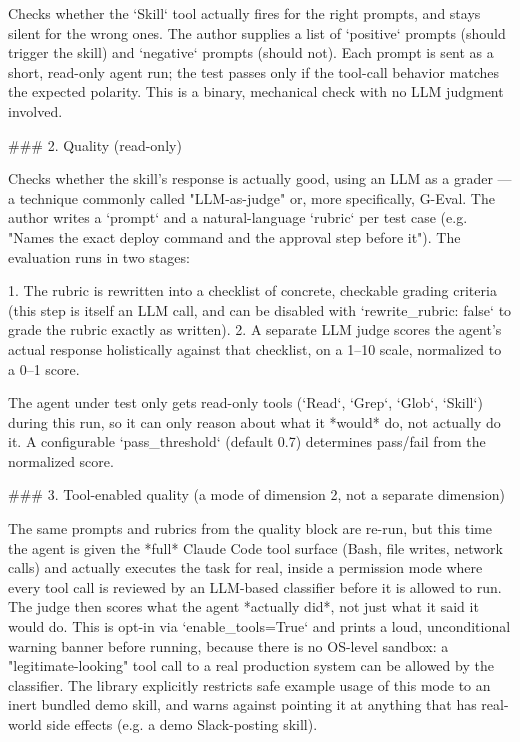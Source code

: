 Checks whether the `Skill` tool actually fires for the right prompts, and stays silent for the wrong ones.
The author supplies a list of `positive` prompts (should trigger the skill) and `negative` prompts (should not).
Each prompt is sent as a short, read-only agent run; the test passes only if the tool-call behavior matches the expected polarity.
This is a binary, mechanical check with no LLM judgment involved.

### 2. Quality (read-only)

Checks whether the skill's response is actually good, using an LLM as a grader — a technique commonly called "LLM-as-judge" or, more specifically, G-Eval.
The author writes a `prompt` and a natural-language `rubric` per test case (e.g. "Names the exact deploy command and the approval step before it").
The evaluation runs in two stages:

1. The rubric is rewritten into a checklist of concrete, checkable grading criteria (this step is itself an LLM call, and can be disabled with `rewrite_rubric: false` to grade the rubric exactly as written).
2. A separate LLM judge scores the agent's actual response holistically against that checklist, on a 1–10 scale, normalized to a 0–1 score.

The agent under test only gets read-only tools (`Read`, `Grep`, `Glob`, `Skill`) during this run, so it can only reason about what it *would* do, not actually do it.
A configurable `pass_threshold` (default 0.7) determines pass/fail from the normalized score.

### 3. Tool-enabled quality (a mode of dimension 2, not a separate dimension)

The same prompts and rubrics from the quality block are re-run, but this time the agent is given the *full* Claude Code tool surface (Bash, file writes, network calls) and actually executes the task for real, inside a permission mode where every tool call is reviewed by an LLM-based classifier before it is allowed to run.
The judge then scores what the agent *actually did*, not just what it said it would do.
This is opt-in via `enable_tools=True` and prints a loud, unconditional warning banner before running, because there is no OS-level sandbox: a "legitimate-looking" tool call to a real production system can be allowed by the classifier.
The library explicitly restricts safe example usage of this mode to an inert bundled demo skill, and warns against pointing it at anything that has real-world side effects (e.g. a demo Slack-posting skill).

